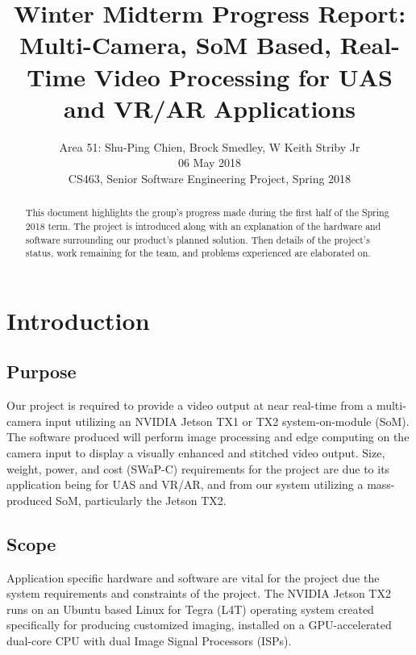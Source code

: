 \documentclass[letterpaper,10pt,serif,draftclsnofoot,onecolumn,compsoc,titlepage]{IEEEtran}
\title{Winter Midterm Progress Report: Multi-Camera, SoM Based, Real-Time Video Processing for UAS and VR/AR Applications}
\author{Area 51: Shu-Ping Chien, Brock Smedley, W Keith Striby Jr \\ 06 May 2018 \\ CS463, Senior Software Engineering Project, Spring 2018}
\begin{document}
\begin{titlepage}
\maketitle

\begin{abstract}

This document highlights the group's progress made during the first half of the 
Spring 2018 term. The project is introduced along with an explanation of the 
hardware and software surrounding our product's planned solution. Then details of 
the project's status, work remaining for the team, and problems experienced are 
elaborated on. \\


\thispagestyle{empty}
\end{abstract}
\end{titlepage}

\newpage
\tableofcontents

\newpage

\section{Introduction}

\subsection{Purpose}
Our project is required to provide a video output at near real-time from a 
multi-camera input utilizing an NVIDIA Jetson TX1 or TX2 system-on-module (SoM). 
The software produced will perform image processing and edge computing on the 
camera input to display a visually enhanced and stitched video output. 
Size, weight, power, and cost (SWaP-C) requirements for the project are due 
to its application being for UAS and VR/AR, and from our system utilizing a 
mass-produced SoM, particularly the Jetson TX2. \\

\subsection{Scope}

Application specific hardware and software are vital for the project due the 
system requirements and constraints of the project.
The NVIDIA Jetson TX2 runs on an Ubuntu based Linux for Tegra (L4T) operating 
system created specifically for producing customized imaging, installed on a 
GPU-accelerated dual-core CPU with dual Image Signal Processors (ISPs). \\
\end{document}
